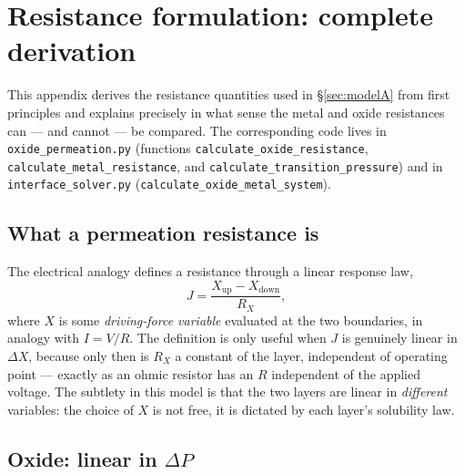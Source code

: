 \documentclass[11pt,a4paper]{article}
\newcommand{\code}[1]{\texttt{#1}}
\begin{document}



\appendix
\section{Resistance formulation: complete derivation}
\label{app:resistance}

\begin{sloppypar}
This appendix derives the resistance quantities used in \S\ref{sec:modelA}
from first principles and explains precisely in what sense the metal and
oxide resistances can --- and cannot --- be compared. The corresponding code
lives in \code{oxide\_permeation.py} (functions
\code{calculate\_oxide\_resistance}, \code{calculate\_metal\_resistance},
and \code{calculate\_transition\_pressure}) and in
\code{interface\_solver.py} (\code{calculate\_oxide\_metal\_system}).
\end{sloppypar}

\subsection{What a permeation resistance is}

The electrical analogy defines a resistance through a linear response law,
\begin{equation}
  J = \frac{X_{\mathrm{up}} - X_{\mathrm{down}}}{R_X},
  \label{eq:app-linresp}
\end{equation}
where $X$ is some \emph{driving-force variable} evaluated at the two
boundaries, in analogy with $I = V/R$. The definition is only useful when $J$
is genuinely linear in $\Delta X$, because only then is $R_X$ a constant of
the layer, independent of operating point --- exactly as an ohmic resistor
has an $R$ independent of the applied voltage. The subtlety in this model is
that the two layers are linear in \emph{different} variables: the choice of
$X$ is not free, it is dictated by each layer's solubility law.

\subsection{Oxide: linear in $\Delta P$}
\end{document}
